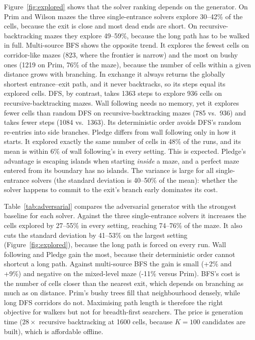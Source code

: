 Figure~\ref{fig:explored} shows that the solver ranking depends on the generator.
On Prim and Wilson mazes the three single-entrance solvers explore 30--42\% of the cells, because the exit is close and most dead ends are short.
On recursive-backtracking mazes they explore 49--59\%, because the long path has to be walked in full.
Multi-source BFS shows the opposite trend.
It explores the fewest cells on corridor-like mazes (823, where the frontier is narrow) and the most on bushy ones (1219 on Prim, 76\% of the maze), because the number of cells within a given distance grows with branching.
In exchange it always returns the globally shortest entrance--exit path, and it never backtracks, so its steps equal its explored cells.
DFS, by contrast, takes 1363 steps to explore 936 cells on recursive-backtracking mazes.
Wall following needs no memory, yet it explores fewer cells than random DFS on recursive-backtracking mazes (785 vs.\ 936) and takes fewer steps (1084 vs.\ 1363).
Its deterministic order avoids DFS's random re-entries into side branches.
Pledge differs from wall following only in how it starts.
It explored exactly the same number of cells in 48\% of the runs, and its mean is within 6\% of wall following's in every setting.
This is expected.
Pledge's advantage is escaping islands when starting \emph{inside} a maze, and a perfect maze entered from its boundary has no islands.
The variance is large for all single-entrance solvers (the standard deviation is 40--50\% of the mean): whether the solver happens to commit to the exit's branch early dominates its cost.

Table~\ref{tab:adversarial} compares the adversarial generator with the strongest baseline for each solver.
Against the three single-entrance solvers it increases the cells explored by 27--55\% in every setting, reaching 74--76\% of the maze.
It also cuts the standard deviation by 41--53\% on the largest setting (Figure~\ref{fig:explored}), because the long path is forced on every run.
Wall following and Pledge gain the most, because their deterministic order cannot shortcut a long path.
Against multi-source BFS the gain is small (+2\% and +9\%) and negative on the mixed-level maze (-11\% versus Prim).
BFS's cost is the number of cells closer than the nearest exit, which depends on branching as much as on distance.
Prim's bushy trees fill that neighbourhood densely, while long DFS corridors do not.
Maximising path length is therefore the right objective for walkers but not for breadth-first searchers.
The price is generation time ($28\times$ recursive backtracking at 1600 cells, because $K=100$ candidates are built), which is affordable offline.

